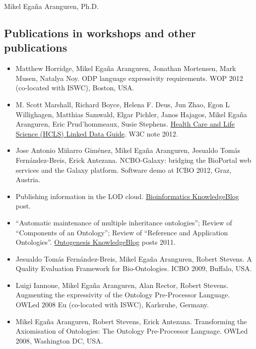 \documentclass[english,11pt,a4paper,oneside]{article}
\begin{document}
\begin{cv}{Mikel Ega\~na Aranguren, Ph.D. }
\subsection*{Publications in workshops and other publications}

\begin{itemize}
	\item Matthew Horridge, Mikel Ega\~na Aranguren, Jonathan Mortensen, Mark Musen, Natalya Noy. ODP language expressivity requirements. WOP 2012 (co-located with ISWC), Boston, USA. %
	
	\item M. Scott Marshall, Richard Boyce, Helena F. Deus, Jun Zhao, Egon L Willighagen, Matthias Samwald, Elgar Pichler, Janos Hajagos, Mikel Ega\~na Aranguren, Eric Prud'hommeaux, Susie Stephens. \href{http://www.w3.org/2001/sw/hcls/notes/hcls-rdf-guide/}{Health Care and Life Science (HCLS) Linked Data Guide}. W3C note 2012.
	
	\item Jose Antonio Mi\~narro Gim\'enez, Mikel Ega\~na Aranguren, Jesualdo Tom\'as Fern\'andez-Breis, Erick Antezana. NCBO-Galaxy: bridging the BioPortal web services and the Galaxy platform. Software demo at ICBO 2012, Graz, Austria.
	
	\item Publishing information in the LOD cloud. \href{http://bioinformatics.knowledgeblog.org}{Bioinformatics KnowledgeBlog} post.
	
	\item ``Automatic maintenance of multiple inheritance ontologies''; Review of ``Components of an Ontology''; Review of ``Reference and Application Ontologies''. \href{http://ontogenesis.knowledgeblog.org}{Ontogenesis KnowledgeBlog} posts 2011.
	
	\item Jesualdo Tom\'as Fern\'andez-Breis, Mikel Ega\~na Aranguren, Robert Stevens. A Quality Evaluation Framework for Bio-Ontologies. ICBO 2009, Buffalo, USA.
	
	\item Luigi Iannone, Mikel Ega\~na Aranguren, Alan Rector, Robert Stevens. Augmenting the expressivity of the Ontology Pre-Processor Language. OWLed 2008 Eu (co-located with ISWC), Karlsruhe, Germany.

	\item Mikel Ega\~na Aranguren, Robert Stevens, Erick Antezana. Transforming the Axiomisation of Ontologies: The Ontology Pre-Processor Language. OWLed 2008, Washington DC, USA.
	

\end{itemize}
\end{cv}
\end{document}
